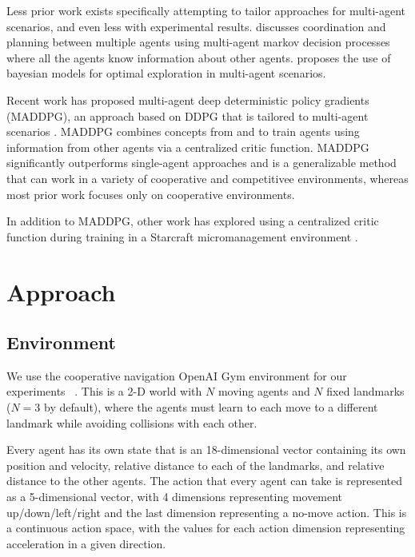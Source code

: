 \documentclass{article}
\begin{document}
Less prior work exists specifically attempting to tailor approaches for multi-agent scenarios, and even less with experimental results. \cite{boutilier1996planning} discusses coordination and planning between multiple agents using multi-agent markov decision processes where all the agents know information about other agents. \cite{chalkiadakis2003coordination} proposes the use of bayesian models for optimal exploration in multi-agent scenarios.

Recent work has proposed multi-agent deep deterministic policy gradients (MADDPG), an approach based on DDPG that is tailored to multi-agent scenarios \cite{maddpg}. MADDPG combines concepts from \cite{suttonbarto1998rl} and \cite{lillicrap2015continuous} to train agents using information from other agents via a centralized critic function. MADDPG significantly outperforms single-agent approaches and is a generalizable method that can work in a variety of cooperative and competitivee environments, whereas most prior work focuses only on cooperative environments.

In addition to MADDPG, other work has explored using a centralized critic function during training in a Starcraft micromanagement environment \cite{coma}.

\section{Approach}

\subsection{Environment}

We use the cooperative navigation OpenAI Gym environment for our experiments ~\cite{openaigym}. This is a 2-D world with $N$ moving agents and $N$ fixed landmarks ($N=3$ by default), where the agents must learn to each move to a different landmark while avoiding collisions with each other.

Every agent has its own state that is an 18-dimensional vector containing its own position and velocity, relative distance to each of the landmarks, and relative distance to the other agents. The action that every agent can take is represented as a 5-dimensional vector, with 4 dimensions representing movement up/down/left/right and the last dimension representing a no-move action. This is a continuous action space, with the values for each action dimension representing acceleration in a given direction.
\end{document}
